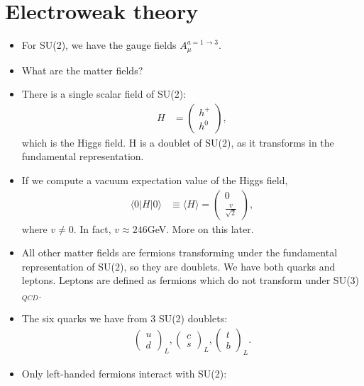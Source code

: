 \documentclass[relqm.tex]{subfiles}
\begin{document}
\section{Electroweak theory}
\begin{itemize}
    \item For SU(2), we have the gauge fields $A_\mu^{a=1\to3}$.
    \item What are the matter fields?
    \item There is a single scalar field of SU(2):
        \begin{align}
            H &= \begin{pmatrix}h^+\\h^0\end{pmatrix},
        \end{align}
        which is the Higgs field.
        H is a doublet of SU(2), as it transforms in the fundamental representation.
    \item If we compute a vacuum expectation value of the Higgs field, 
        \begin{align}
            \langle0|H|0\rangle &\equiv \langle H\rangle = \begin{pmatrix}0\\\frac{v}{\sqrt{2}}\end{pmatrix},
        \end{align}
        where $v\neq0$. In fact, $v\approx246$GeV.
        More on this later.
    \item All other matter fields are fermions transforming under the fundamental representation of SU(2), so they are doublets.
        We have both quarks and leptons. 
        Leptons are defined as fermions which do not transform under SU(3)$_{QCD}$.
    \item The six quarks we have from 3 SU(2) doublets:
        \begin{align}
            \begin{pmatrix}u\\d\end{pmatrix}_L,
            \begin{pmatrix}c\\s\end{pmatrix}_L,
            \begin{pmatrix}t\\b\end{pmatrix}_L.
        \end{align}
    \item Only left-handed fermions interact with SU(2):
        \begin{align}

\end{align}
\end{itemize}
\end{document}
